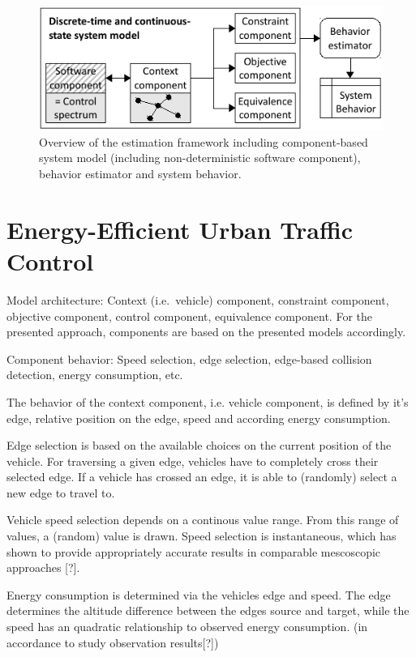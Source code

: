 \documentclass[conference]{../cls/IEEEtran}
\begin{document}
\begin{figure}[b]
	\centering
	\includegraphics{../gfx/framework.pdf}
	\caption{Overview of the estimation framework including component-based system model (including non-deterministic software component), behavior estimator and system behavior.}
	\label{figure:framework}
\end{figure}

\section{Energy-Efficient Urban Traffic Control}

Model architecture: Context (i.e.\ vehicle) component, constraint component, objective component, control component, equivalence component.
For the presented approach, components are based on the presented models
accordingly.

Component behavior: Speed selection, edge selection, edge-based collision detection, energy consumption, etc.

The behavior of the context component, i.e. vehicle component, is defined by
it's edge, relative position on the edge, speed and according energy
consumption.

Edge selection is based on the available choices on the current position of the
vehicle. For traversing a given edge, vehicles have to completely cross their
selected edge. If a vehicle has crossed an edge, it is able to (randomly)
select a new edge to travel to. 

Vehicle speed selection depends on a continous value range.
From this range of values, a (random) value is drawn. Speed selection is
instantaneous, which has shown to provide appropriately accurate results in
comparable mescoscopic approaches [?].

Energy consumption is determined via the vehicles edge and speed. The edge determines the altitude difference between the edges source and
target, while the speed has an quadratic relationship to observed energy
consumption. (in accordance to study observation results[?])
\end{document}
